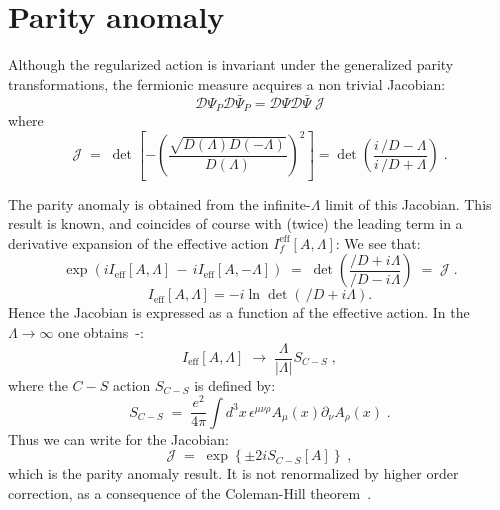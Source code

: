 \documentclass[a4paper,12pt]{article}
\newcommand{\Dcslash}{/\!\!\!\! D}
\begin{document}
\section{Parity anomaly}\label{sec:anom}

Although the regularized action is invariant under the generalized
parity transformations, the fermionic measure acquires a non trivial
Jacobian:
\begin{equation}
\mathcal{D}\Psi_P\mathcal{D}\bar{\Psi}_P =
\mathcal{D}\Psi\mathcal{D}\bar{\Psi}\; {\mathcal J}
\end{equation}
where
\begin{equation}
{\mathcal J} \;=\;\det\left[-\left(\frac{\sqrt{D(\Lambda)D(-\Lambda)}}{D(\Lambda)}
  \right)^2\right] = \det\left(
  \frac{i\,\Dcslash -\Lambda}{i\,\Dcslash +\Lambda} \right) \;.
\end{equation}

The parity anomaly is obtained from the infinite-$\Lambda$ limit of
this Jacobian. This result is known, and coincides of course with
(twice) the leading term in a derivative expansion of the effective
action $I_f^{\mathrm{eff}}[A,\Lambda]$: We see that:
\begin{equation}
\exp(iI_{\mathrm{eff}}[A,\Lambda]\,-\,iI_{\mathrm{eff}}[A,-\Lambda])
\;=\; \det\left( \frac{\Dcslash+i\Lambda}{\Dcslash-i\Lambda}\right) \;=\; \mathcal{J}\;.
\end{equation}
\begin{equation}
I_{\mathrm{eff}}[A,\Lambda] = -i \ln \det(\,\Dcslash+i\Lambda).
\end{equation}
Hence the Jacobian is expressed as a function af the effective action.
In the $\Lambda\to\infty$ one obtains~\cite{Dunne}-\cite{S}:
\begin{equation}
I_{\mathrm{eff}}[A,\Lambda]\;\to\; \frac{\Lambda}{|\Lambda|} S_{C-S}\;,
\end{equation}
where the $C-S$ action $S_{C-S}$ is defined by:
\begin{equation}
  \label{eq:scs}
  S_{C-S}\;=\;\frac{e^2}{4\pi} \int d^3x\,\epsilon^{\mu\nu\rho}
  A_{\mu}(x) \partial_{\nu} A_{\rho}(x) \;.
\end{equation}
Thus we can write for the Jacobian:
\begin{equation}
\label{eq:jac}
\mathcal{J} \;=\; \exp\left\{ \pm 2 i S_{C-S}[A] \right\} \;, 
\end{equation}
which is the parity anomaly result. It is not renormalized by higher
order correction, as a consequence of the Coleman-Hill
theorem~\cite{Coleman-Hill}.
\end{document}
